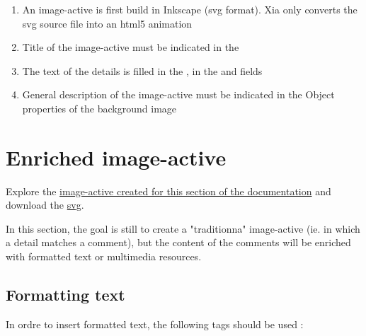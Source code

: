 \begin{enumerate}
 \item An image-active is first build in Inkscape (svg format). Xia only 
 converts the svg source file into an html5 animation
 \item Title of the image-active must be indicated in the 
 \item The text of the details is filled in the , 
 in the  and  fields
 \item General description of the image-active must be indicated in the \chemin
{Object properties} of the background image
\end{enumerate}

\section{Enriched image-active}

Explore the \href{http://geoffrey-gekiere.ac-versailles.fr/xia2}{image-active 
created for this section of the documentation} and download the 
\href{http://geoffrey-gekiere.ac-versailles.fr/xia2/svg/xia2.svg}{svg}.

In this section, the goal is still to create a "traditionna" image-active 
(ie. in which a detail matches a comment), but the content of the comments 
will be enriched with  formatted text or multimedia resources.

\subsection{Formatting text}

In ordre to insert formatted text, the following tags should be used :

